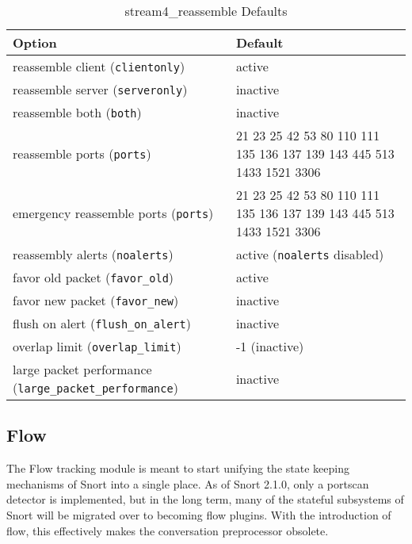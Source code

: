 \documentclass[english]{report}
\begin{document}
%
\begin{table}[!hbpt]

\caption{stream4\_reassemble Defaults\label{stream4 reassemble defaults}}

\begin{center}\begin{tabular}{| l | p{3in} |}
\hline 
\textbf{Option} &
\textbf{Default}\\
\hline
\hline 
reassemble client (\texttt{clientonly}) & active\\
\hline 
reassemble server (\texttt{serveronly}) & inactive\\
\hline 
reassemble both (\texttt{both}) & inactive\\
\hline
reassemble ports (\texttt{ports}) & 21 23 25 42 53 80 110 111 135 136 137 139 143 445 513 1433 1521 3306\\
\hline
emergency reassemble ports (\texttt{ports}) & 21 23 25 42 53 80 110 111 135 136 137 139 143 445 513 1433 1521 3306\\
\hline 
reassembly alerts (\texttt{noalerts}) & active (\texttt{noalerts} disabled)\\
\hline
favor old packet (\texttt{favor\_old}) & active\\
\hline
favor new packet (\texttt{favor\_new}) & inactive\\
\hline
flush on alert (\texttt{flush\_on\_alert}) & inactive\\
\hline
overlap limit (\texttt{overlap\_limit}) & -1 (inactive)\\
\hline
large packet performance (\texttt{large\_packet\_performance}) & inactive\\
\hline
\end{tabular}
\end{center}
\end{table}

\clearpage

\subsection{Flow\label{sub:flow}}

The Flow tracking module is meant to start unifying the state keeping
mechanisms of Snort into a single place. As of Snort 2.1.0, only a portscan
detector is implemented, but in the long term,  many of the stateful subsystems
of Snort will be migrated over to becoming flow plugins. With the introduction
of flow, this effectively makes the conversation preprocessor obsolete.
\end{document}
